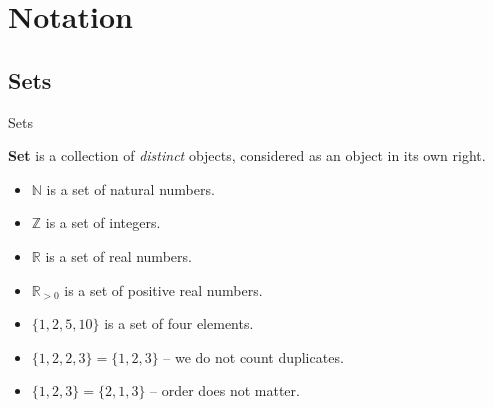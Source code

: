 \documentclass{beamer}
\begin{document}
    \section{Notation}

    \subsection{Sets}

    \begin{frame}{Sets}
      \begin{definition}
        \textbf{Set} is a collection of \textit{distinct} objects, considered as an object in its own right.
      \end{definition}\pause

      \begin{example}
        \begin{itemize}
          \item $\mathbb{N}$ is a set of natural numbers.
          \item $\mathbb{Z}$ is a set of integers.
          \item $\mathbb{R}$ is a set of real numbers.
          \item $\mathbb{R}_{>0}$ is a set of positive real numbers.\pause
          \item $\{1, 2, 5, 10\}$ is a set of four elements.
          \item $\{1, 2, 2, 3\} = \{1,2,3\}$ -- we do not count duplicates.
          \item $\{1,2,3\} = \{2,1,3\}$ -- order does not matter.
        \end{itemize}
      \end{example}
    \end{frame}
\end{document}
